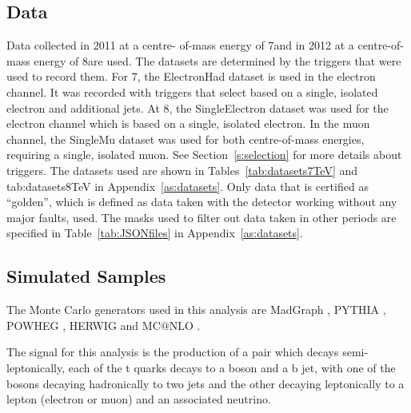 \subsection{Data}
\label{ss:data}

Data collected in 2011 at a centre-  of-mass energy of 7\TeV and in 2012 at a centre-of-mass energy of
8\TeV are used. The datasets are determined by the triggers that were used to record them. For 7\TeV, the ElectronHad
dataset is used in the electron channel. It was recorded with triggers that select based on a single, isolated
electron and additional jets. At 8\TeV, the SingleElectron dataset was used for the electron channel
which is based on a single, isolated electron. In the muon channel, the SingleMu dataset was used for both
centre-of-mass energies, requiring a single, isolated muon. See Section~\ref{s:selection} for more
details about triggers. The datasets used are shown in Tables~\ref{tab:datasets7TeV} and {tab:datasets8TeV} in
Appendix~\ref{as:datasets}. Only data that is certified as “golden”, which is defined as data taken with the
detector working without any major faults, used. The masks used to filter out data taken in other periods are
specified in Table~\ref{tab:JSONfiles} in Appendix~\ref{as:datasets}.

\subsection{Simulated Samples}
\label{ss:simulated_samples}
The Monte Carlo generators used in this analysis are MadGraph \cite{madgraph}, PYTHIA \cite{pythia8}, POWHEG
\cite{powheg_Nason,powheg_Frixione,powheg_Alioli}, HERWIG \cite{herwig} and MC$@$NLO
\cite{mcatnlo_Frixione1, mcatnlo_Frixione2}.

The signal for this analysis is the production of a \ttbar pair which decays semi-leptonically, \ie each of
the t quarks decays to a \W boson and a b jet, with one of the \W bosons decaying hadronically to two jets and
the other decaying leptonically to a lepton (electron or muon) and an associated neutrino.

